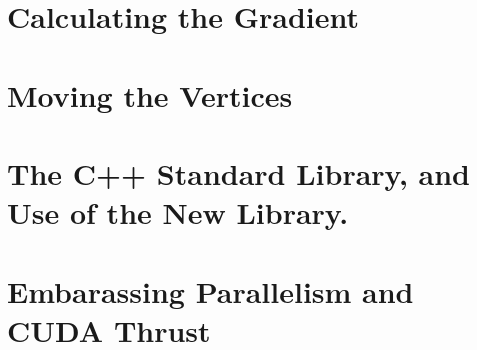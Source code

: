 

\section{Calculating the Gradient}
\section{Moving the Vertices}
\section{The C++ Standard Library, and Use of the New Library.}
\section{Embarassing Parallelism and CUDA Thrust}
